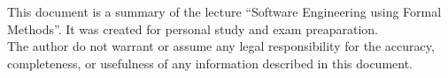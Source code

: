\large{This document is a summary of the lecture ``Software Engineering using Formal Methods''. It was created for personal study and exam preaparation.\\

The author do not warrant or assume any legal responsibility for the accuracy, completeness, or usefulness of any information described in this document.}